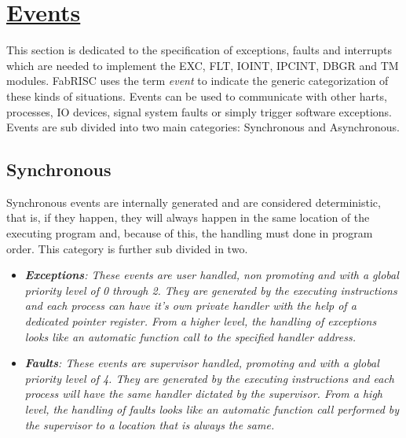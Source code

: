 \section[Events]{\LARGE\underline{Events}}

    \vspace{10pt}

    This section is dedicated to the specification of exceptions, faults and interrupts which are needed to implement the EXC, FLT, IOINT, IPCINT, DBGR and TM modules. FabRISC uses the term \textit{event} to indicate the generic categorization of these kinds of situations. Events can be used to communicate with other harts, processes, IO devices, signal system faults or simply trigger software exceptions. Events are sub divided into two main categories: Synchronous and Asynchronous.

    \subsection{Synchronous}

        \vspace{10pt}

        Synchronous events are internally generated and are considered deterministic, that is, if they happen, they will always happen in the same location of the executing program and, because of this, the handling must done in program order. This category is further sub divided in two.

        \begin{itemize}

            \item \textit{\textbf{Exceptions}: These events are user handled, non promoting and with a global priority level of 0 through 2. They are generated by the executing instructions and each process can have it's own private handler with the help of a dedicated pointer register. From a higher level, the handling of exceptions looks like an automatic function call to the specified handler address.}

            \item \textit{\textbf{Faults}: These events are supervisor handled, promoting and with a global priority level of 4. They are generated by the executing instructions and each process will have the same handler dictated by the supervisor. From a high level, the handling of faults looks like an automatic function call performed by the supervisor to a location that is always the same.}

        \end{itemize}

